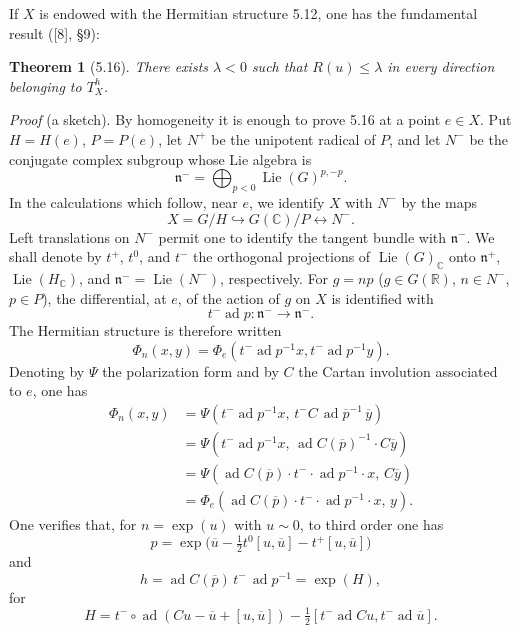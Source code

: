 \documentclass[10pt]{article}
\newcommand{\C}{\mathbb C}
\newcommand{\R}{\mathbb R}
\theoremstyle{deligne}
\newtheorem*{theorem}{Theorem}
\newcommand{\Lie}{\operatorname{Lie}}
\newcommand{\ad}{\operatorname{ad}}
\begin{document}
If $X$ is endowed with the Hermitian structure 5.12, one has the fundamental result ([8], §9):

\begin{theorem}[5.16]
There exists $\lambda<0$ such that $R(u)\le\lambda$ in every direction belonging to $T_X^h$.
\end{theorem}

\emph{Proof} (a sketch). By homogeneity it is enough to prove 5.16 at a point $e\in X$. Put $H=H(e)$, $P=P(e)$, let $N^+$ be the unipotent radical of $P$, and let $N^-$ be the conjugate complex subgroup whose Lie algebra is
\[
  \mathfrak n^-=\bigoplus_{p<0}\Lie(G)^{p,-p}.
\]
In the calculations which follow, near $e$, we identify $X$ with $N^-$ by the maps
\[
  X=G/H \hookrightarrow G(\C)/P \longleftrightarrow N^-.
\]
Left translations on $N^-$ permit one to identify the tangent bundle with $\mathfrak n^-$. We shall denote by $t^+$, $t^0$, and $t^-$ the orthogonal projections of $\Lie(G)_\C$ onto $\mathfrak n^+$, $\Lie(H_\C)$, and $\mathfrak n^-=\Lie(N^-)$, respectively. For $g=np$ ($g\in G(\R)$, $n\in N^-$, $p\in P$), the differential, at $e$, of the action of $g$ on $X$ is identified with
\[
  t^-\ad p:\mathfrak n^-\longrightarrow \mathfrak n^- .
\]
The Hermitian structure is therefore written
\[
  \Phi_n(x,y)=\Phi_e(t^-\ad p^{-1}x,t^-\ad p^{-1}y).
\]
Denoting by $\Psi$ the polarization form and by $C$ the Cartan involution associated to $e$, one has
\[
\begin{aligned}
 \Phi_n(x,y)
 &=\Psi(t^-\ad p^{-1}x,\,t^- C\,\ad \overline{p}^{-1}\,\overline y)\\
 &=\Psi(t^-\ad p^{-1}x,\,\ad C(\overline p)^{-1}\cdot C\overline y)\\
 &=\Psi(\ad C(\overline p)\cdot t^-\cdot\ad p^{-1}\cdot x,\,C\overline y)\\
 &=\Phi_e(\ad C(\overline p)\cdot t^-\cdot\ad p^{-1}\cdot x,\,y).
\end{aligned}
\]
One verifies that, for $n=\exp(u)$ with $u\sim0$, to third order one has
\[
  p=\exp\bigl(\overline u-\tfrac12t^0[u,\overline u]-t^+[u,\overline u]\bigr)
\]
and
\[
  h=\ad C(\overline p)\,t^-\,\ad p^{-1}=\exp(H),
\]
for
\[
  H=t^-\circ\ad(Cu-\overline u+[u,\overline u])
  -\tfrac12[t^-\ad Cu,t^-\ad\overline u].
\]
\end{document}
